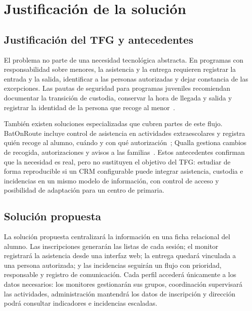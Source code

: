 \section{Justificación de la solución}\label{sec:1-2}

\subsection{Justificación del TFG y antecedentes}\label{sec:1-2-1}

El problema no parte de una necesidad tecnológica abstracta. En programas con responsabilidad sobre menores, la asistencia y la entrega requieren registrar la entrada y la salida, identificar a las personas autorizadas y dejar constancia de las excepciones. Las pautas de seguridad para programas juveniles recomiendan documentar la transición de custodia, conservar la hora de llegada y salida y registrar la identidad de la persona que recoge al menor~\cite{ref31}.

También existen soluciones especializadas que cubren partes de este flujo. BatOnRoute incluye control de asistencia en actividades extraescolares y registra quién recoge al alumno, cuándo y con qué autorización~\cite{ref32}; Qualla gestiona cambios de recogida, autorizaciones y avisos a las familias~\cite{ref33}. Estos antecedentes confirman que la necesidad es real, pero no sustituyen el objetivo del TFG: estudiar de forma reproducible si un CRM configurable puede integrar asistencia, custodia e incidencias en un mismo modelo de información, con control de acceso y posibilidad de adaptación para un centro de primaria.

\subsection{Solución propuesta}\label{sec:1-2-2}

La solución propuesta centralizará la información en una ficha relacional del alumno. Las inscripciones generarán las listas de cada sesión; el monitor registrará la asistencia desde una interfaz web; la entrega quedará vinculada a una persona autorizada; y las incidencias seguirán un flujo con prioridad, responsable y registro de comunicación. Cada perfil accederá únicamente a los datos necesarios: los monitores gestionarán sus grupos, coordinación supervisará las actividades, administración mantendrá los datos de inscripción y dirección podrá consultar indicadores e incidencias escaladas.

